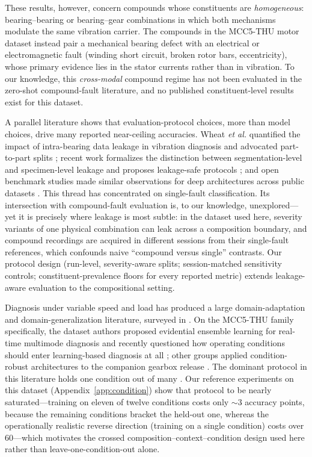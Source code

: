 These results, however, concern compounds whose constituents are
\emph{homogeneous}: bearing--bearing or bearing--gear combinations in which
both mechanisms modulate the same vibration carrier. The compounds in the
MCC5-THU motor dataset instead pair a mechanical bearing defect with an
electrical or electromagnetic fault (winding short circuit, broken rotor
bars, eccentricity), whose primary evidence lies in the stator currents
rather than in vibration. To our knowledge, this \emph{cross-modal}
compound regime has not been evaluated in the zero-shot compound-fault
literature, and no published constituent-level results exist for this
dataset.

A parallel literature shows that evaluation-protocol choices, more than
model choices, drive many reported near-ceiling accuracies. Wheat
\emph{et al.} quantified the impact of intra-bearing data leakage in
vibration diagnosis and advocated part-to-part splits \cite{wheat2024};
recent work formalizes the distinction between segmentation-level and
specimen-level leakage and proposes leakage-safe protocols
\cite{gama2025,phme2025}; and open benchmark studies made similar
observations for deep architectures across public datasets
\cite{zhao2020benchmark}. This thread has concentrated on single-fault
classification. Its intersection with compound-fault evaluation is, to our
knowledge, unexplored---yet it is precisely where leakage is most subtle:
in the dataset used here, severity variants of one physical combination can
leak across a composition boundary, and compound recordings are acquired in
different sessions from their single-fault references, which confounds
naive ``compound versus single'' contrasts. Our protocol design (run-level,
severity-aware splits; session-matched sensitivity controls;
constituent-prevalence floors for every reported metric) extends
leakage-aware evaluation to the compositional setting.

Diagnosis under variable speed and load has produced a large
domain-adaptation and domain-generalization literature, surveyed in
\cite{han2025}. On the MCC5-THU family specifically, the dataset authors
proposed evidential ensemble learning for real-time multimode diagnosis
\cite{liu2024tii} and recently questioned how operating conditions should
enter learning-based diagnosis at all \cite{rethinking2025}; other groups
applied condition-robust architectures to the companion gearbox release
\cite{wang2024,phmap2025}. The dominant protocol in this literature holds
one condition out of many \cite{han2025,domainshift2025}. Our reference
experiments on this dataset (Appendix~\ref{app:condition}) show that
protocol to be nearly saturated---training on eleven of twelve conditions
costs only ${\sim}3$ accuracy points, because the remaining conditions
bracket the held-out one, whereas the operationally realistic reverse
direction (training on a single condition) costs over 60---which motivates
the crossed composition--context--condition design used here rather than
leave-one-condition-out alone.


